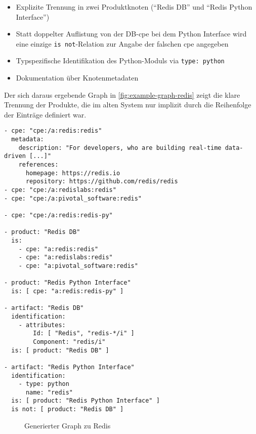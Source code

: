 \begin{itemize}
    \itemsep0em
    \item Explizite Trennung in zwei Produktknoten (\enquote{Redis DB} und \enquote{Redis Python Interface})
    \item Statt doppelter Auflistung von der DB-\acrshort{cpe} bei dem Python Interface wird eine einzige \texttt{is not}-Relation zur Angabe der falschen \acrshort{cpe} angegeben
    \item Typspezifische Identifikation des Python-Moduls via \texttt{type: python}
    \item Dokumentation über Knotenmetadaten
\end{itemize}

Der sich daraus ergebende Graph in \autoref{fig:example-graph-redis} zeigt die klare Trennung der Produkte, die im alten System nur implizit durch die Reihenfolge der Einträge definiert war.

\begin{lstlisting}[style=yaml,caption={Produktmodellierung zu Redis},label={lst:new-correlation-redis},basicstyle=\ttfamily\scriptsize]
- cpe: "cpe:/a:redis:redis"
  metadata:
    description: "For developers, who are building real-time data-driven [...]"
    references:
      homepage: https://redis.io
      repository: https://github.com/redis/redis
- cpe: "cpe:/a:redislabs:redis"
- cpe: "cpe:/a:pivotal_software:redis"

- cpe: "cpe:/a:redis:redis-py"

- product: "Redis DB"
  is:
    - cpe: "a:redis:redis"
    - cpe: "a:redislabs:redis"
    - cpe: "a:pivotal_software:redis"

- product: "Redis Python Interface"
  is: [ cpe: "a:redis:redis-py" ]

- artifact: "Redis DB"
  identification:
    - attributes:
        Id: [ "Redis", "redis-*/i" ]
        Component: "redis/i"
  is: [ product: "Redis DB" ]

- artifact: "Redis Python Interface"
  identification:
    - type: python
      name: "redis"
  is: [ product: "Redis Python Interface" ]
  is not: [ product: "Redis DB" ]
\end{lstlisting}

\begin{figure}[htbp]
    \centering
    \makebox[\textwidth]{}
    \caption{Generierter Graph zu Redis}
    \label{fig:example-graph-redis}
\end{figure}

